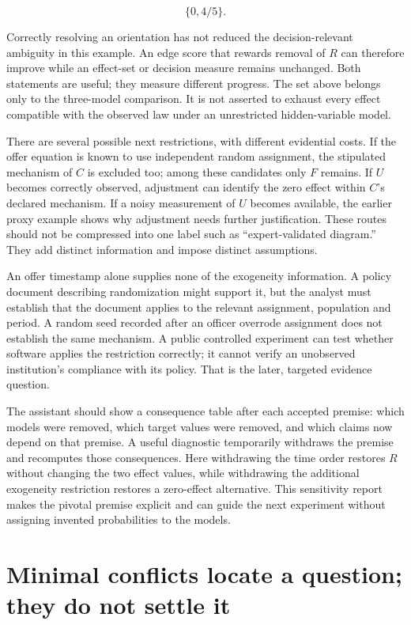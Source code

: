 \[
 \{0,4/5\}.
\]

Correctly resolving an orientation has not reduced the decision-relevant
ambiguity in this example. An edge score that rewards removal of \(R\)
can therefore improve while an effect-set or decision measure remains
unchanged. Both statements are useful; they measure different progress.
The set above belongs only to the three-model comparison. It is not
asserted to exhaust every effect compatible with the observed law under
an unrestricted hidden-variable model.

There are several possible next restrictions, with different evidential
costs. If the offer equation is known to use independent random
assignment, the stipulated mechanism of \(C\) is excluded too; among
these candidates only \(F\) remains. If \(U\) becomes correctly
observed, adjustment can identify the zero effect within \(C\)'s
declared mechanism. If a noisy measurement of \(U\) becomes available,
the earlier proxy example shows why adjustment needs further
justification. These routes should not be compressed into one label such
as ``expert-validated diagram.'' They add distinct information and
impose distinct assumptions.

An offer timestamp alone supplies none of the exogeneity information. A
policy document describing randomization might support it, but the
analyst must establish that the document applies to the relevant
assignment, population and period. A random seed recorded after an
officer overrode assignment does not establish the same mechanism. A
public controlled experiment can test whether software applies the
restriction correctly; it cannot verify an unobserved institution's
compliance with its policy. That is the later, targeted evidence
question.

The assistant should show a consequence table after each accepted
premise: which models were removed, which target values were removed,
and which claims now depend on that premise. A useful diagnostic
temporarily withdraws the premise and recomputes those consequences.
Here withdrawing the time order restores \(R\) without changing the two
effect values, while withdrawing the additional exogeneity restriction
restores a zero-effect alternative. This sensitivity report makes the
pivotal premise explicit and can guide the next experiment without
assigning invented probabilities to the models.

\hypertarget{minimal-conflicts-locate-a-question-they-do-not-settle-it}{%
\section{Minimal conflicts locate a question; they do not settle
it}\label{minimal-conflicts-locate-a-question-they-do-not-settle-it}}

